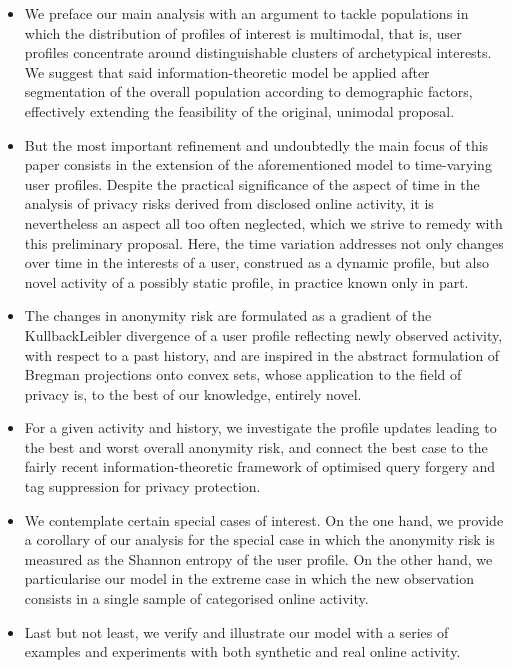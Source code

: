 \begin{itemize}
\item We preface our main analysis with an argument to tackle populations in which the distribution of profiles of interest is multimodal, that is, user profiles concentrate around distinguishable clusters of archetypical interests. We suggest that said information-theoretic model be applied after segmentation of the overall population according to demographic factors, effectively extending the feasibility of the original, unimodal proposal.

\item But the most important refinement and undoubtedly the main focus of this paper consists in the extension of the aforementioned model to time-varying user profiles. Despite the practical significance of the aspect of time in the analysis of privacy risks derived from disclosed online activity, it is nevertheless an aspect all too often neglected, which we strive to remedy with this preliminary proposal. Here, the time variation addresses not only changes over time in the interests of a user, construed as a dynamic profile, but also novel activity of a possibly static profile, in practice known only in part.

\item The changes in anonymity risk are formulated as a gradient of the Kullback\hyph Leibler divergence of a user profile reflecting newly observed activity, with respect to a past history, and are inspired in the abstract formulation of Bregman projections onto convex sets, whose application to the field of privacy is, to the best of our knowledge, entirely novel.

\item For a given activity and history, we investigate the profile updates leading to the best and worst overall anonymity risk, and connect the best case to the fairly recent information-theoretic framework of optimised query forgery and tag suppression for privacy protection.

\item We contemplate certain special cases of interest. On the one hand, we provide a corollary of our analysis for the special case in which the anonymity risk is measured as the Shannon entropy of the user profile. On the other hand, we particularise our model in the extreme case in which the new observation consists in a single sample of categorised online activity.

\item Last but not least, we verify and illustrate our model with a series of examples and experiments with both synthetic and real online activity.

\end{itemize}

